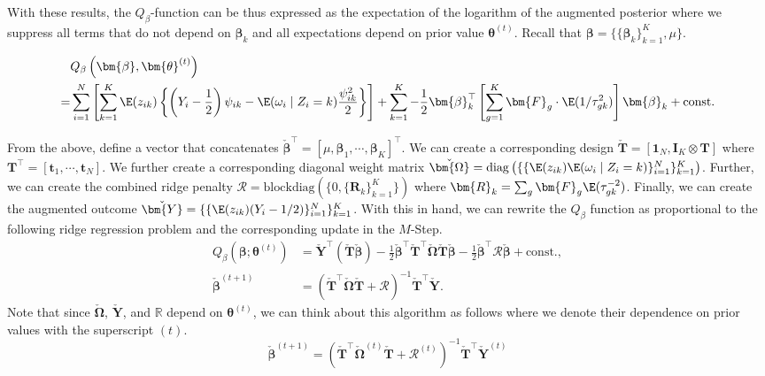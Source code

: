 With these results, the $Q_\beta$-function can be thus expressed as the
expectation of the logarithm of the augmented posterior where we suppress all terms
that do not depend on $\bm{\beta}_k$ and all expectations depend on prior value $\bm{\theta}^{(t)}$. Recall that $\bm{\beta} = \{\{\bm{\beta}_k\}_{k=1}^K, \mu\}$.

\begin{align}
  & Q_\beta\left(\bm{\beta}, \bm{\theta}^{(t)}\right)\nonumber  \\
  = &\sum_{i=1}^N \left[\sum_{k=1}^K \E(z_{ik})\left\{\left(Y_i -
      \frac{1}{2}\right) \psi_{ik} - \E(\omega_i \mid Z_i = k)
      \frac{\psi^2_{ik}}{2}\right\} \right]  + \sum_{k=1}^K -\frac{1}{2}
      \bm{\beta}_k^\top \left[\sum_{g=1}^K \bm{F}_g \cdot
     \E(1/\tau^2_{gk})\right] \bm{\beta}_k + \text{const.} \label{eq:q_func}
\end{align}

From the above, define a vector that concatenates
$\check{\bm{\beta}}^\top = [\mu, \bm{\beta}_1, \cdots,
\bm{\beta}_K]^\top$. We can create a corresponding design
$\check{\bm{T}} = [\bm{1}_{N}, \bm{I}_K \otimes \bm{T}]$
where $\bm{T}^\top = [\bm{t}_1, \cdots, \bm{t}_N]$. We further create
a corresponding diagonal weight matrix
$\check{\bm{\Omega}} =
\mathrm{diag}\left(\{\{\E(z_{ik})\E(\omega_{i}\mid Z_i =
  k)\}_{i=1}^N\}_{k=1}^K\right)$. Further, we can create the combined
ridge penalty
$\bm{\mathcal{R}} = \mathrm{blockdiag}\left(\{0,
  \{\bm{R}_k\}_{k=1}^K\}\right)$ where
$\bm{R}_k = \sum_g \bm{F}_g \E(\tau^{-2}_{gk})$. Finally, we can
create the augmented outcome
$\check{\bm{Y}} = \{\{\E(z_{ik}) (Y_i - 1/2)\}_{i=1}^N\}_{k=1}^K$. With
this in hand, we can rewrite the $Q_\beta$ function as proportional to
the following ridge regression problem and the corresponding update in
the $M$-Step.
\begin{align*}
  Q_\beta\left(\bm{\beta};
  \bm{\theta}^{(t)}\right) & = \check{\bm{Y}}^\top
                               \left(\check{\bm{T}}
                               \check{\bm{\beta}}\right) - \frac{1}{2}
                               \check{\bm{\beta}}^\top
                               \check{\bm{T}}^\top \check{\bm{\Omega}}
                               \check{\bm{T}} \check{\bm{\beta}} -
                               \frac{1}{2} \check{\bm{\beta}}^\top
                               \bm{\mathcal{R}} \check{\bm{\beta}}  + \text{const.},\\
  \check{\bm{\beta}}^{(t+1)} &= \left(\check{\bm{T}}^\top \check{\bm{\Omega}} \check{\bm{T}} + \bm{\mathcal{R}}\right)^{-1} \check{\bm{T}}^\top \check{\bm{Y}}.
\end{align*}
Note that since $\check{\bm{\Omega}}$, $\check{\bm{Y}}$, and
$\mathcal{\mathbb{R}}$ depend on $\bm{\theta}^{(t)}$, we can think
about this algorithm as follows where we denote their dependence on
prior values with the superscript $(t)$.
$$\check{\bm{\beta}}^{(t+1)}  = \left(\check{\bm{T}}^\top \check{\bm{\Omega}}^{(t)} \check{\bm{T}} + \bm{\mathcal{R}}^{(t)}\right)^{-1} \check{\bm{T}}^\top \check{\bm{Y}}^{(t)} $$

